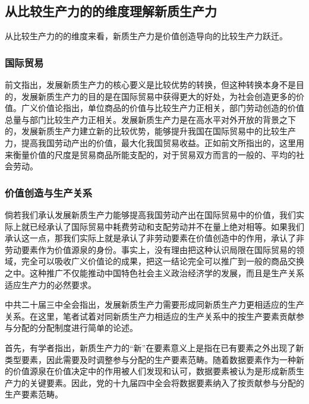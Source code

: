 \subsection{从比较生产力的的维度理解新质生产力}

从比较生产力的的维度来看，新质生产力是价值创造导向的比较生产力跃迁。

\subsubsection{国际贸易}

前文指出，发展新质生产力的核心要义是比较优势的转换，但这种转换本身不是目的，发展新质生产力的目的是在国际贸易中获得更大的好处，为社会创造更多的价值。广义价值论指出，单位商品的价值与比较生产力正相关，部门劳动创造的价值总量与部门比较生产力正相关。发展新质生产力是在高水平对外开放的背景之下的\cite[518]{XiJinPingXiJinPingJingJiWenXuanDiYiJuan2025}，发展新质生产力建立新的比较优势，能够提升我国在国际贸易中的比较生产力，提高我国劳动产出的价值，最大化我国贸易收益\cite[76]{LiuLeYiJingTaiBiJiaoYouShiDongTaiHuaDeQuDongLiYuLiShiJingYanJianLunFaZhanXinZhiShengChanLiYuTiShengChanYeLianGongYingLianRenXingNeiYin2025}。正如前文所指出的，这里用来衡量价值的尺度是贸易商品所能支配的，对于贸易双方而言的一般的、平均的社会劳动。
\subsubsection{价值创造与生产关系}

倘若我们承认发展新质生产力能够提高我国劳动产出在国际贸易中的价值，我们实际上就已经承认了国际贸易中耗费劳动和支配劳动并不在量上绝对相等。如果我们承认这一点，那我们实际上就是承认了非劳动要素在价值创造中的作用，承认了非劳动要素作为价值源泉的身份。事实上，没有理由把这种认识局限在国际贸易的领域，完全可以吸收广义价值论的成果，把这一结论完全可以推广到一般的商品交换之中。这种推广不仅能推动中国特色社会主义政治经济学的发展，而且是生产关系适应生产力的必然要求。

中共二十届三中全会指出，发展新质生产力需要形成同新质生产力更相适应的生产关系\cite[11]{ZhongGongZhongYangGuanYuJinYiBuQuanMianShenHuaGaiGeTuiJinZhongGuoShiXianDaiHuaDeJueDing2024}。在这里，笔者试着对同新质生产力相适应的生产关系中的按生产要素贡献参与分配的分配制度进行简单的论述。

首先，有学者指出，新质生产力的“新”在要素意义上是指在已有要素之外出现了新类型要素\cite[138]{GaoFanXinZhiShengChanLiDeTiChuLuoJiDuoWeiNeiHanJiShiDaiYiYi2023}，因此需要及时调整参与分配的生产要素范畴。随着数据要素作为一种新的价值源泉在价值决定中的作用被人们发现和认可，数据要素被认为是形成新质生产力的关键要素\cite[18]{ChaoXiaoJingXinZhiShengChanLiQuDongGaoZhiLiangFaZhanDeLuoJiYuLuJing2024}\cite[138]{GaoFanXinZhiShengChanLiDeTiChuLuoJiDuoWeiNeiHanJiShiDaiYiYi2023}\cite{ZhangXiaHengShuJuYaoSuTuiJinXinZhiShengChanLiShiXianDeNeiZaiJiZhiYuLuJingYanJiu2024}。因此，党的十九届四中全会将数据要素纳入了按贡献参与分配的生产要素范畴\cite[39]{ZhongGuoGongChanDangDiShiJiuJieZhongYangWeiYuanHuiDiSiCiQuanTiHuiYiWenJianHuiBian2019}。

